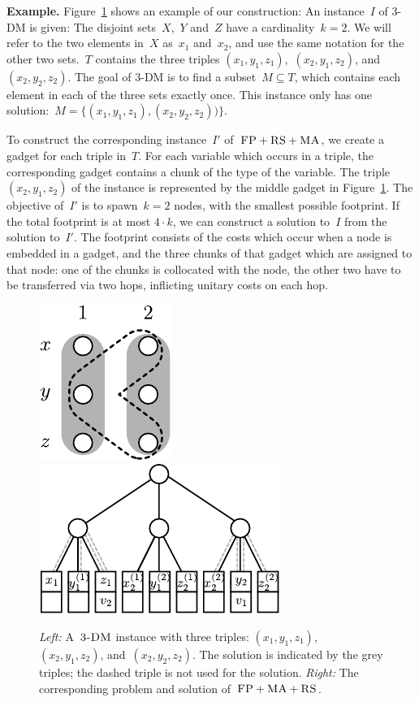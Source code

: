 \textbf{Example.} Figure~\ref{fig:fprsma} shows an example of our construction: An
instance~$I$ of 3-DM is given: The disjoint sets~$X$,~$Y$ and~$Z$ have a
cardinality~$k=2$. We will refer to the two elements in~$X$ as~$x_1$ and~$x_2$,
and use the same notation for the other two sets.~$T$ contains the three triples
$(x_1, y_1,
z_1)$,~$(x_2, y_1, z_2)$, and~$(x_2, y_2, z_2)$. The goal of 3-DM is to find a
subset~$M \subseteq T$, which contains each element in each of the three sets
exactly once. This instance only has one solution:~$M =
\{(x_1,y_1,z_1),(x_2,y_2,z_2))\}$.

To construct the corresponding instance~$I'$ of~$\textsc{FP}+\textsc{RS}+\textsc{MA}$, we
create a gadget for each triple in~$T$. For each variable which occurs in a
triple, the corresponding gadget contains a chunk of the
type of the variable. The triple
$(x_2, y_1, z_2)$ of the instance is represented by the middle gadget in
Figure~\ref{fig:fprsma}. The objective of~$I'$ is to spawn~$k=2$ nodes,
with the smallest possible footprint. If the total footprint is at most $4\cdot k$, we can construct a solution to~$I$ from the solution to~$I'$.
The footprint consists of the costs which occur when a node is embedded in a
gadget, and the three chunks of that gadget which are assigned to that node: one of
the chunks is collocated with the node, the other two have to be transferred
via two hops, inflicting unitary costs on each hop.
\begin{figure}[t]
\includegraphics[width = 0.3\columnwidth]{figs/static-mapping/np_3dm_formular}
\hfill
\includegraphics[width = 0.6\columnwidth]{figs/static-mapping/np_3dm_construction}
\caption{\textit{Left:} A~$\textsc{3-DM}$ instance with three triples:
$(x_1, y_1, z_1)$,~$(x_2, y_1, z_2)$, and~$(x_2, y_2, z_2)$. The solution is
indicated by the grey triples; the dashed triple is not used for the
solution. \textit{Right:} The corresponding problem and solution of~$\textsc{FP} + \textsc{MA}
+ \textsc{RS}$.}
\label{fig:fprsma}
\end{figure}


